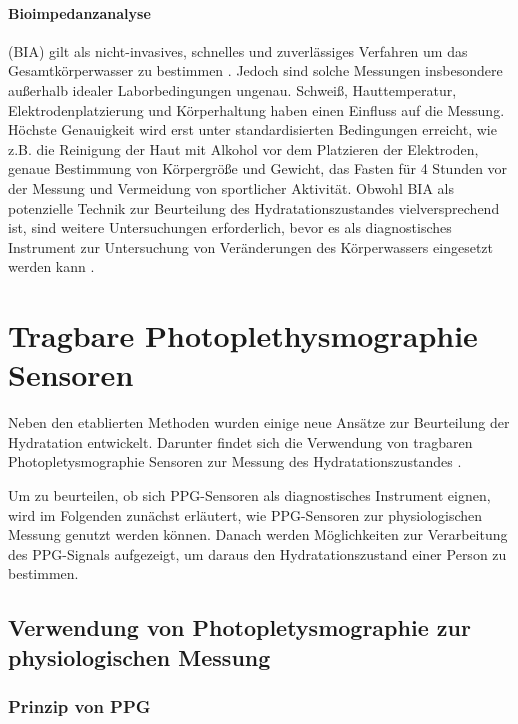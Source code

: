 \documentclass[10pt,a4paper,headinclude,twoside, plainheadsepline, open=right, numbers=noenddot, twocolumn]{article}
\begin{document}
\paragraph{Bioimpedanzanalyse} (BIA) gilt als nicht-invasives, schnelles und zuverlässiges Verfahren um das Gesamtkörperwasser zu bestimmen \cite{kavouras2002assessing}.
Jedoch sind solche Messungen insbesondere außerhalb idealer Laborbedingungen ungenau.
Schweiß, Hauttemperatur, Elektrodenplatzierung und Körperhaltung haben einen Einfluss auf die Messung.
Höchste Genauigkeit wird erst unter standardisierten Bedingungen erreicht, wie z.B. die Reinigung der Haut mit Alkohol vor dem Platzieren der Elektroden, genaue Bestimmung von Körpergröße und Gewicht, das Fasten für 4 Stunden vor der Messung und Vermeidung von sportlicher Aktivität. 
Obwohl BIA als potenzielle Technik zur Beurteilung des Hydratationszustandes vielversprechend ist, sind weitere Untersuchungen erforderlich, bevor es als diagnostisches Instrument zur Untersuchung von Veränderungen des Körperwassers eingesetzt werden kann \cite{garret2018engineering, kavouras2002assessing}.

\section{Tragbare Photoplethysmographie Sensoren}
\label{tragbare photoplethysmographie sensoren}

Neben den etablierten Methoden wurden einige neue Ansätze zur Beurteilung der Hydratation entwickelt.
Darunter findet sich die Verwendung von tragbaren Photopletysmographie Sensoren zur Messung des Hydratationszustandes \cite{kirenko2017unobtrusive, mcpherson2015systems, grudic2017hemodynamic, suryadevara2015towards}.

Um zu beurteilen, ob sich PPG-Sensoren als diagnostisches Instrument eignen, wird im Folgenden zunächst erläutert, wie PPG-Sensoren zur physiologischen Messung genutzt werden können.
Danach werden Möglichkeiten zur Verarbeitung des PPG-Signals aufgezeigt, um daraus den Hydratationszustand einer Person zu bestimmen.

\subsection{Verwendung von Photopletysmographie zur physiologischen Messung}
\label{verwendung von photopletysmographie zur physiologischen messung}

\subsubsection{Prinzip von PPG}
\label{prinzip von ppg}
\end{document}
